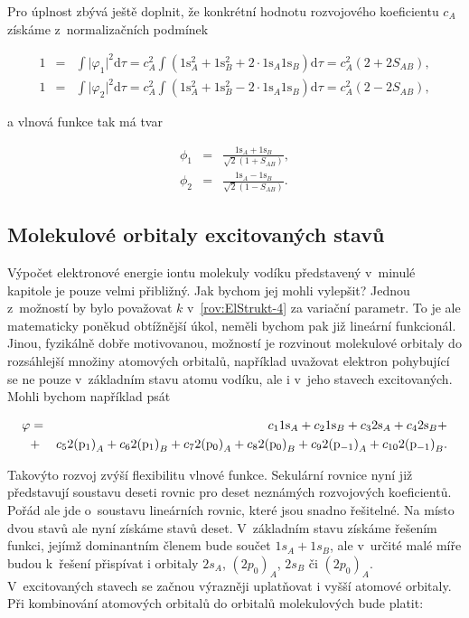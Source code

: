 Pro úplnost zbývá ještě doplnit, že konkrétní hodnotu rozvojového koeficientu $c_A$ získáme z~normalizačních podmínek


\begin{eqnarray}
1 &=& \int \vert \varphi_1 \vert^2 \mathrm{d}\tau = c_A^2 \int (1\mathrm{s}_A^2 + 1 \mathrm{s}_B^2 + 2 \cdot 1\mathrm{s}_A 1\mathrm{s}_B) \mathrm{d}\tau = c_A^2 (2 + 2S_{AB}), \nonumber \\
1 &=& \int \vert \varphi_2 \vert^2 \mathrm{d}\tau = c_A^2 \int (1\mathrm{s}_A^2 + 1 \mathrm{s}_B^2 - 2 \cdot 1\mathrm{s}_A 1\mathrm{s}_B) \mathrm{d}\tau = c_A^2 (2 - 2S_{AB}), 
\label{rov:ElStrukt-14}
\end{eqnarray}


\noindent a vlnová funkce tak má tvar


\begin{eqnarray}
\phi_1 &=& \frac{1\mathrm{s}_A + 1\mathrm{s}_B}{\sqrt{2}(1+S_{AB})}, \nonumber \\
\phi_2 &=& \frac{1\mathrm{s}_A - 1\mathrm{s}_B}{\sqrt{2}(1-S_{AB})}.
\label{rov:ElStrukt-15}
\end{eqnarray}

\subsection{Molekulové orbitaly excitovaných stavů}

Výpočet elektronové energie iontu molekuly vodíku představený v~minulé kapitole je pouze velmi přibližný. Jak bychom jej mohli vylepšit? Jednou z~možností by bylo považovat $k$ v~\eqref{rov:ElStrukt-4} za variační parametr. To je ale matematicky poněkud obtížnější úkol, neměli bychom pak již lineární funkcionál. Jinou, fyzikálně dobře motivovanou, možností je rozvinout molekulové orbitaly do rozsáhlejší množiny atomových orbitalů, například uvažovat elektron pohybující se ne pouze v~základním stavu atomu vodíku, ale i v~jeho stavech excitovaných. Mohli bychom například psát

\begin{eqnarray}
\varphi &=& c_1 1 \mathrm{s}_{A} + c_2 1 \mathrm{s}_{B} + c_3 2 \mathrm{s}_{A} + c_4 2 \mathrm{s}_{B} + \nonumber \\
&+& c_5 2 \mathrm{(p_1)}_{A} + c_6 2 \mathrm{(p_1)}_{B} + c_7 2 \mathrm{(p_0)}_{A} + c_8 2 \mathrm{(p_0)}_{B} + c_9 2 \mathrm{(p_{-1})}_{A} + c_{10} 2 \mathrm{(p_{-1})}_{B}.
\label{rov:ElStrukt-16}
\end{eqnarray}

\noindent Takovýto rozvoj zvýší flexibilitu vlnové funkce. Sekulární rovnice nyní již představují soustavu deseti rovnic pro deset neznámých rozvojových koeficientů. Pořád ale jde o~soustavu lineárních rovnic, které jsou snadno řešitelné. Na místo dvou stavů ale nyní získáme stavů deset. V~základním stavu získáme řešením funkci, jejímž dominantním členem bude součet $1s_A+1s_B$, ale v~určité malé míře budou k~řešení přispívat i orbitaly $2s_A$, $(2p_0)_A$, $2s_B$ či $(2p_0)_A$. V~excitovaných stavech se začnou výrazněji uplatňovat i vyšší atomové orbitaly. Při kombinování atomových orbitalů do orbitalů molekulových bude platit:

